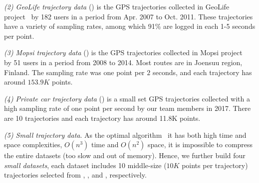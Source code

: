 \vspace{0.5ex}
\ni \emph{(2) GeoLife trajectory data} (\geolife) is the GPS trajectories collected in GeoLife project~\cite{Zheng:GeoLife} by 182 users in a period from Apr. 2007 to Oct. 2011. These trajectories have a variety of sampling rates, among which 91\% are logged in each 1-5 seconds per point. %

\vspace{0.5ex}
\ni \emph{(3) Mopsi trajectory data} (\mopsi) is the GPS trajectories collected in Mopsi project~\cite{Mopsi} by 51 users in a period from 2008 to 2014. Most routes are in Joensuu region, Finland.
The sampling rate was one point per $2$ seconds, and each trajectory has around $153.9K$ points.

\vspace{0.5ex}
\ni \emph{(4) Private car trajectory data} (\pricar) is a small set GPS trajectories collected with a high sampling rate of one point per second by our team members in 2017. There are 10 trajectories and each trajectory has around 11.8K points.


\vspace{0.5ex}
\ni \emph{(5) Small trajectory data}.
As the optimal \lsa algorithm~\cite{Imai:Optimal} it has both high time and space complexities, \ie $O(n^3)$ time and $O(n^2)$ space, it is impossible to compress the entire datasets (too slow and out of memory). Hence, we further build four \textit{small datasets}, each dataset includes 10 middle-size ($10K$ points per trajectory) trajectories selected from \sercar, \geolife, \mopsi and \pricar, respectively.


